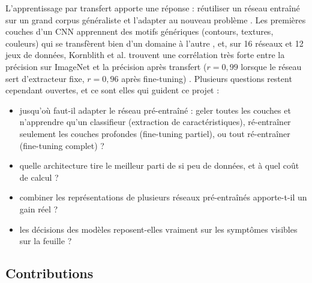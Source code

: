 L'apprentissage par transfert apporte une réponse : réutiliser un réseau entraîné sur un grand corpus généraliste et l'adapter au nouveau problème \cite{pan2010survey}. Les premières couches d'un CNN apprennent des motifs génériques (contours, textures, couleurs) qui se transfèrent bien d'un domaine à l'autre \cite{yosinski2014transferable}, et, sur 16 réseaux et 12 jeux de données, Kornblith et al. trouvent une corrélation très forte entre la précision sur ImageNet et la précision après transfert ($r=0{,}99$ lorsque le réseau sert d'extracteur fixe, $r=0{,}96$ après fine-tuning) \cite{kornblith2019better}. Plusieurs questions restent cependant ouvertes, et ce sont elles qui guident ce projet :
\begin{itemize}
  \item jusqu'où faut-il adapter le réseau pré-entraîné : geler toutes les couches et n'apprendre qu'un classifieur (extraction de caractéristiques), ré-entraîner seulement les couches profondes (fine-tuning partiel), ou tout ré-entraîner (fine-tuning complet) ?
  \item quelle architecture tire le meilleur parti de si peu de données, et à quel coût de calcul ?
  \item combiner les représentations de plusieurs réseaux pré-entraînés apporte-t-il un gain réel ?
  \item les décisions des modèles reposent-elles vraiment sur les symptômes visibles sur la feuille ?
\end{itemize}

\subsection{Contributions}


